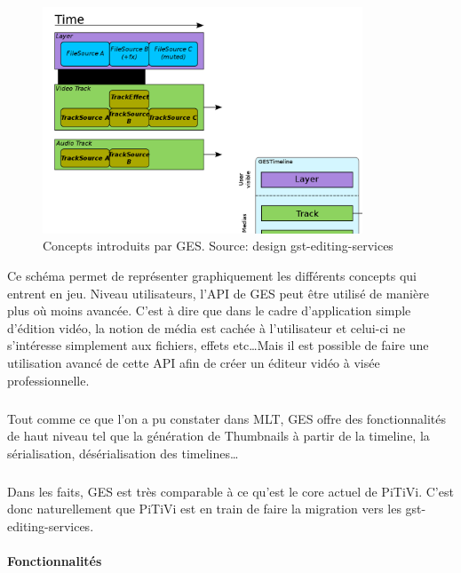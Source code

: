 \begin{figure} [H]

  \begin{center}

    \includegraphics[width=0.85\textwidth]{images/ges}

  \end{center}

  \caption{Concepts introduits par GES. Source: design
  gst-editing-services}

  \label{Yes}

\end{figure}

Ce schéma permet de représenter graphiquement les différents concepts
qui entrent en jeu. Niveau utilisateurs, l'API de GES peut
être utilisé de manière plus où moins avancée. C'est à dire
que dans le cadre d'application simple d'édition vidéo, la notion
de média est cachée à l'utilisateur et celui-ci ne s'intéresse
simplement aux fichiers, effets etc\ldots Mais il est possible de faire
une utilisation avancé de cette API afin de créer un éditeur vidéo
à visée professionnelle.

\subparagraph{}

Tout comme ce que l'on a pu constater dans MLT, GES offre des
fonctionnalités de haut niveau tel que la génération de Thumbnails
à partir de la timeline, la sérialisation, désérialisation des
timelines\ldots

\subparagraph{}

Dans les faits, GES est très comparable à ce qu'est le core actuel
de PiTiVi. C'est donc naturellement que PiTiVi est en train de faire la
migration vers les gst-editing-services.

\paragraph{Fonctionnalités}

